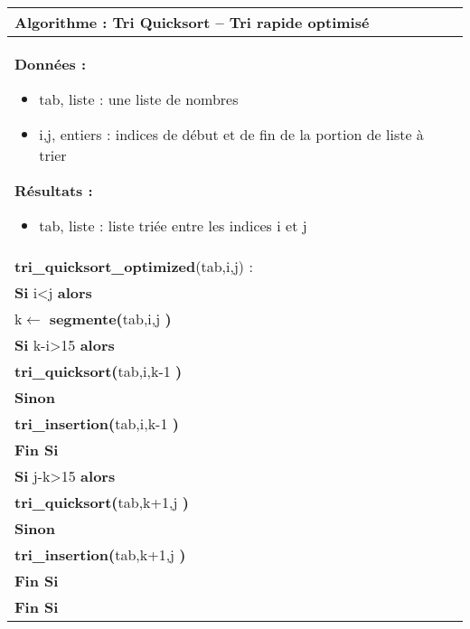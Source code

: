 \documentclass[10pt,fleqn]{article} %
\begin{document}
\begin{pseudo}
~\\

\begin{tabular}{p{}}
\hline
\textbf{Algorithme :} Tri Quicksort -- Tri rapide optimisé\\
\hline
\textbf{Données :}
\begin{itemize}
\item \textsf{tab}, liste : une liste de nombres
\item \textsf{i,j}, entiers : indices de début et de fin de la portion de liste à trier
\end{itemize}
\textbf{Résultats :} 
\begin{itemize}
\item \textsf{tab}, liste : liste triée entre les indices \textsf{i} et \textsf{j}
\end{itemize}
\\
\textbf{tri\_quicksort\_optimized}(\textsf{tab,i,j}) :\\
\hspace{.4cm} \textbf{Si} \textsf{i<j} \textbf{alors} \\
\hspace{.8cm} \textsf{k$\leftarrow$} \textbf{segmente(}\textsf{tab,i,j} \textbf{)} \\
\hspace{.8cm} \textbf{Si} \textsf{k-i>15} \textbf{alors} \\
\hspace{1.2cm} \textbf{tri\_quicksort(}\textsf{tab,i,k-1} \textbf{)} \\
\hspace{.8cm} \textbf{Sinon} \\
\hspace{1.2cm} \textbf{tri\_insertion(}\textsf{tab,i,k-1} \textbf{)} \\
\hspace{.8cm} \textbf{Fin Si} \\
\hspace{.8cm} \textbf{Si} \textsf{j-k>15} \textbf{alors} \\
\hspace{1.2cm} \textbf{tri\_quicksort(}\textsf{tab,k+1,j} \textbf{)} \\
\hspace{.8cm} \textbf{Sinon} \\
\hspace{1.2cm} \textbf{tri\_insertion(}\textsf{tab,k+1,j} \textbf{)} \\
\hspace{.8cm} \textbf{Fin Si} \\
\hspace{.4cm} \textbf{Fin Si} \\
\hline
\end{tabular}
\end{pseudo}
\end{document}
